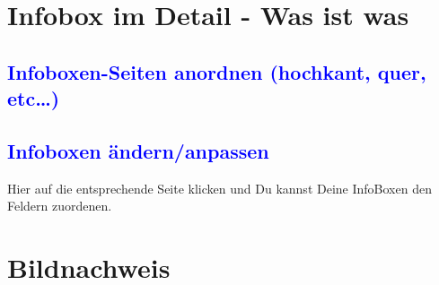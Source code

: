 \section{Infobox im Detail - Was ist was}
\subsection*{\textcolor{blue}{Infoboxen-Seiten anordnen (hochkant, quer, etc\dots)}}
\bc\sk\blink{}\blink{}\ec
\subsection*{\textcolor{blue}{Infoboxen ändern/anpassen}}
\bc\sk\blink{}\blink{}\ec
Hier auf die entsprechende Seite klicken und Du kannst Deine InfoBoxen
den Feldern zuordenen.
\newpage\section{Bildnachweis}
